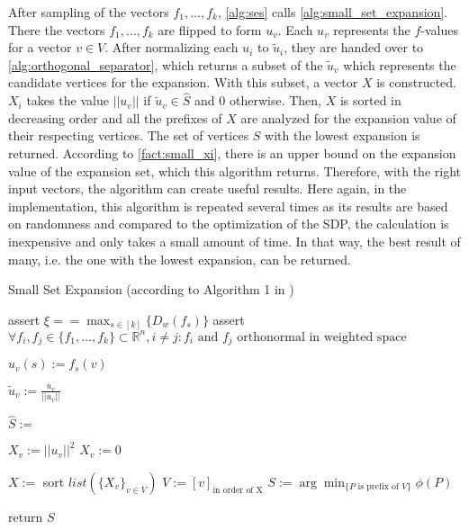After sampling of the vectors $f_1, \ldots, f_k$, \cref{alg:ses} calls \cref{alg:small_set_expansion}. There the vectors $f_1 , \ldots , f_k$ are flipped to form $u_v$. Each $u_v$ represents the $f$-values for a vector $v\in V$.
After normalizing each $u_i$ to $\tilde{u}_i $, they are handed over to \cref{alg:orthogonal_separator}, which returns a subset of the $\tilde{u}_v$ which represents the candidate vertices for the expansion. With this subset, a vector $X$ is constructed. $X_i$  takes the value $||u_v||$ if $\tilde{u}_v \in \hat{S} $ and $0$ otherwise. Then, $X$ is sorted in decreasing order and all the prefixes of $X$ are analyzed for the expansion value of their respecting vertices. The set of vertices $S$ with the lowest expansion is returned. According to \cref{fact:small_xi}, there is an upper bound on the expansion value of the expansion set, which this algorithm returns. Therefore, with the right input vectors, the algorithm can create useful results.
Here again, in the implementation, this algorithm is repeated several times as its results are based on randomness and compared to the optimization of the SDP, the calculation is inexpensive and only takes a small amount of time. In that way, the best result of many, i.e. the one with the lowest expansion, can be returned.
\begin{algorithm}[H]
	\caption{Small Set Expansion (according to Algorithm 1 in \cite{ChanLTZ16}) \label{alg:small_set_expansion}} %
	
	
	\begin{algorithmic}
		\State assert $\xi == \max_{s\in [k]} \{D_w(f_s)\}$
		\State assert $\forall f_i, f_j \in \{f_1, \ldots , f_k\} \subset \mathbb{R}^n, i\neq j: f_i \text{ and } f_j \text{ orthonormal in weighted space} $
		
		\State	$u_v(s) := f_s(v) $
		\EndFor
		\EndFor
		
		\State $\tilde{u}_v := \frac{u_v}{||u_v||}$
		\EndFor
		
		\State $\hat{S} := $ 
		

		\State $X_v := ||u_v||^2$
		\Else
		\State $X_v := 0$
		\EndIf
		
		\EndFor
		\State $X:= $ sort $ list(\{X_v\}_{v \in V})$
		\State $V := [v]_{\text{in order of X}}$
		\State $S := \arg \min_{\{P \text{ is prefix of }V\}}\phi(P)$
		
		\State return $S$
		
	
	
		\EndFunction
		
		
	\end{algorithmic}
\end{algorithm} %
